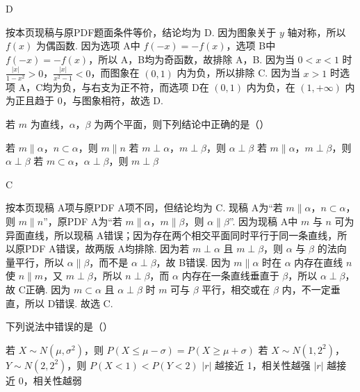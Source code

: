 \begin{answer}
D
\end{answer}

\begin{solution}
按本页现稿与原PDF题面条件等价，结论均为 D. 因为图象关于 \(y\) 轴对称，所以 \(f\left( x \right)\) 为偶函数. 因为选项 A中 \(f\left( -x \right)=-f\left( x \right)\)，选项 B中 \(f\left( -x \right)=-f\left( x \right)\)，所以 A，B均为奇函数，故排除 A，B. 因为当 \(0<x<1\) 时 \(\frac{\left| x \right|}{1-x^{2}}>0\)，\(\frac{\left| x \right|}{x^{2}-1}<0\)，而图象在 \(\left( 0,1 \right)\) 内为负，所以排除 C. 因为当 \(x>1\) 时选项 A，C均为负，与右支为正不符，而选项 D在 \(\left( 0,1 \right)\) 内为负，在 \(\left( 1,+\infty \right)\) 内为正且趋于 \(0\)，与图象相符，故选 D.
\end{solution}

\begin{problem}
若 \(m\) 为直线，\(\alpha\)，\(\beta\) 为两个平面，则下列结论中正确的是（\quad）

\choices
    {若 \(m\parallel \alpha\)，\(n\subset \alpha\)，则 \(m\parallel n\)}
    {若 \(m\perp\alpha\)，\(m\perp\beta\)，则 \(\alpha\perp\beta\)}
    {若 \(m\parallel\alpha\)，\(m\perp\beta\)，则 \(\alpha\perp\beta\)}
    {若 \(m\subset\alpha\)，\(\alpha\perp\beta\)，则 \(m\perp\beta\)}
\end{problem}

\begin{answer}
C
\end{answer}

\begin{solution}
按本页现稿 A项与原PDF A项不同，但结论均为 C. 现稿 A为“若 \(m\parallel \alpha\)，\(n\subset \alpha\)，则 \(m\parallel n\)”，原PDF A为“若 \(m\parallel \alpha\)，\(m\parallel \beta\)，则 \(\alpha\parallel \beta\)”. 因为现稿 A中 \(m\) 与 \(n\) 可为异面直线，所以现稿 A错误；因为存在两个相交平面同时平行于同一条直线，所以原PDF A错误，故两版 A均排除. 因为若 \(m\perp \alpha\) 且 \(m\perp \beta\)，则 \(\alpha\) 与 \(\beta\) 的法向量平行，所以 \(\alpha\parallel \beta\)，而不是 \(\alpha\perp \beta\)，故 B错误. 因为 \(m\parallel \alpha\) 时在 \(\alpha\) 内存在直线 \(n\) 使 \(n\parallel m\)，又 \(m\perp \beta\)，所以 \(n\perp \beta\)，而 \(\alpha\) 内存在一条直线垂直于 \(\beta\)，所以 \(\alpha\perp \beta\)，故 C正确. 因为 \(m\subset \alpha\) 且 \(\alpha\perp \beta\) 时 \(m\) 可与 \(\beta\) 平行，相交或在 \(\beta\) 内，不一定垂直，所以 D错误. 故选 C.
\end{solution}

\begin{problem}
下列说法中错误的是（\quad）

\choices
    {若 \(X\sim N(\mu,\sigma^2)\)，则 \(P(X\le\mu-\sigma)=P(X\ge\mu+\sigma)\)}
    {若 \(X\sim N(1,2^2)\)，\(Y\sim N(2,2^2)\)，则 \(P(X<1)<P(Y<2)\)}
    {\(|r|\) 越接近 1，相关性越强}
    {\(|r|\) 越接近 0，相关性越弱}
\end{problem}

